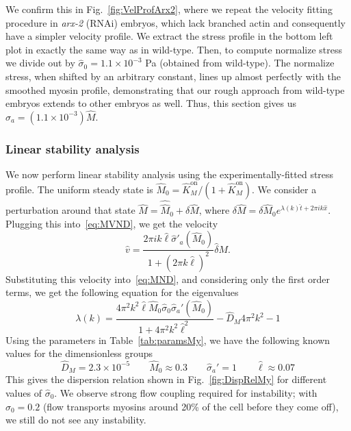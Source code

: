 \documentclass[11pt]{article}
\newcommand{\red}[1]{\color{red}#1\normalcolor}
\newcommand{\6}[1]{#1_{\text{6}}}
\newcommand{\3}[1]{#1_{\text{3}}}
\begin{document}
\red{We confirm this in Fig.\ \ref{fig:VelProfArx2}, where we repeat the velocity fitting procedure in \emph{arx-2} (RNAi) embryos, which lack branched actin and consequently have a simpler velocity profile. We extract the stress profile in the bottom left plot in exactly the same way as in wild-type. Then, to compute normalize stress we divide out by $\hat{\sigma}_0=1.1 \times 10^{-3}$ Pa (obtained from wild-type). The normalize stress, when shifted by an arbitrary constant, lines up almost perfectly with the smoothed myosin profile, demonstrating that our rough approach from wild-type embryos extends to other embryos as well. Thus, this section gives us $\sigma_a = \left(1.1 \times 10^{-3}\right) \hat M$.}


\subsubsection{Linear stability analysis \label{sec:StabMy}}
We now perform linear stability analysis using the experimentally-fitted stress profile. The uniform steady state is $\hat{M}_0= \hat{K}^\text{on}_M/\left(1+\hat{K}^\text{on}_M\right)$. We consider a perturbation around that state $\hat M=\hat \hat{M}_0+\delta \hat M$, where $\delta \hat M = \delta \hat M_0 e^{\lambda(k) \hat{t}+2 \pi i k \hat{x}}$. Plugging this into\ \eqref{eq:MVND}, we get the velocity \cite[Eq.~(11)]{bois2011pattern}
\begin{equation}
\hat v = \frac{2 \pi i k \hat{\ell} \hat{\sigma}'_a(\hat M_0)}{1 + \left(2 \pi k \hat \ell\right)^2} \hat \delta M. 
\end{equation}
Substituting this velocity into\ \eqref{eq:MND}, and considering only the first order terms, we get the following equation for the eigenvalues
\begin{equation}
\label{eq:DispRel}
\lambda(k) = \frac{4\pi^2 k^2 \hat{\ell} \hat{M}_0 \hat{\sigma}_0 \hat \sigma_a'(\hat{M}_0)}{1+4\pi^2 k^2 \hat{\ell}^2} - \hat{D}_M 4 \pi^2 k^2 -1
\end{equation}
Using the parameters in Table\ \ref{tab:paramsMy}, we have the following known values for the dimensionless groups
\begin{equation}
\hat{D}_M = 2.3 \times 10^{-5} \qquad \hat{M}_0 \approx 0.3 \qquad \hat \sigma_a'=1 \qquad \hat{\ell} \approx 0.07
\end{equation}
This gives the dispersion relation shown in Fig.\ \ref{fig:DispRelMy} for different values of $\hat{\sigma}_0$. We observe strong flow coupling required for instability; with $\hat{\sigma}_0=0.2$ (flow transports myosins around 20\% of the cell before they come off), we still do not see any instability. 
\end{document}
